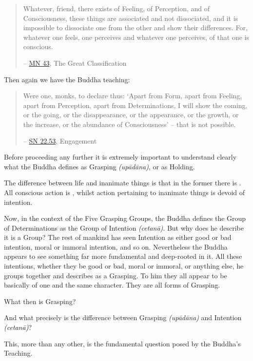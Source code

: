 \begin{quote}
Whatever, friend, there exists of Feeling, of Perception, and of Consciousness, these things are associated and not dissociated, and it is impossible to dissociate one from the other and show their differences. For, whatever one feels, one perceives and whatever one perceives, of that one is conscious.

 -- \href{https://suttacentral.net/mn43/en/sujato}{MN 43}, The Great Classification
\end{quote}

Then again we have the Buddha teaching:

\begin{quote}
Were one, monks, to declare thus: `Apart from Form, apart from Feeling, apart from Perception, apart from Determinations, I will show the coming, or the going, or the disappearance, or the appearance, or the growth, or the increase, or the abundance of Consciousness' -- that is not possible.

 -- \href{https://suttacentral.net/sn22.53/en/bodhi}{SN 22.53}, Engagement
\end{quote}

Before proceeding any further it is extremely important to understand clearly what the Buddha defines as Grasping \emph{(upādāna)}, or as Holding.

The difference between life and inanimate things is that in the former there is . All conscious action is , whilst action pertaining to inanimate things is devoid of intention.

Now, in the context of the Five Grasping Groups, the Buddha defines the Group of Determinations as the Group of Intention \emph{(cetanā)}. But why does he describe it is a  Group? The rest of mankind has seen Intention as either good or bad intention, moral or immoral intention, and so on. Nevertheless the Buddha appears to see something far more fundamental and deep-rooted in it. All these intentions, whether they be good or bad, moral or immoral, or anything else, he groups together and describes as a Grasping. To him they all appear to be basically of one and the same character. They are all forms of Grasping.

What then is Grasping?

And what precisely is the difference between Grasping \emph{(upādāna)} and Intention \emph{(cetanā)}?

This, more than any other, is the fundamental question posed by the Buddha's Teaching.

